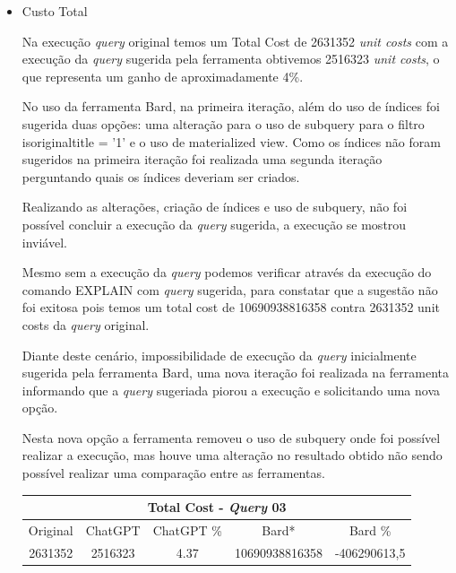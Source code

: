 \documentclass[12pt]{article}
\begin{document}
\begin{itemize}

\item{Custo Total}

Na execução \emph{query} original temos um Total Cost de 2631352 \emph{unit costs} com a execução da \emph{query} sugerida pela ferramenta obtivemos 2516323 \emph{unit costs}, o que representa um ganho de aproximadamente 4\%.

No uso da ferramenta Bard, na primeira iteração, além do uso de índices foi sugerida duas opções: uma alteração para o uso de subquery para o filtro isoriginaltitle = '1' e o uso de materialized view. Como os índices não foram sugeridos na primeira iteração foi realizada uma segunda iteração perguntando quais os índices deveriam ser criados.

Realizando as alterações, criação de índices e uso de subquery, não foi possível concluir a execução da \emph{query} sugerida, a execução se mostrou inviável.

Mesmo sem a execução da \emph{query} podemos verificar através da execução do comando EXPLAIN com \emph{query} sugerida, para constatar que a sugestão não foi exitosa pois temos um total cost de 10690938816358 contra 2631352 unit costs da \emph{query} original.

Diante deste cenário, impossibilidade de execução da \emph{query} inicialmente sugerida pela ferramenta Bard, uma nova iteração foi realizada na ferramenta informando que a \emph{query} sugeriada piorou a execução e solicitando uma nova opção.

Nesta nova opção a ferramenta removeu o uso de subquery onde foi possível realizar a execução, mas houve uma alteração no resultado obtido não sendo possível realizar uma comparação entre as ferramentas.\\

\begin{center}
\begin{tabular}{ |c|c|c|c|c| } 
 \hline
 \multicolumn{5}{|c|}{Total Cost - \emph{Query} 03} \\
 \hline
 Original & ChatGPT & ChatGPT \% & Bard* & Bard \% \\ [0.5ex] 
 \hline
  2631352 & 2516323 & 4.37 & 10690938816358 & -406290613,5 \\ 
  \hline
\end{tabular}
\end{center}



\end{itemize}
\end{document}
